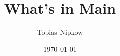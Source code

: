 \documentclass[12pt,a4paper]{article}
\begin{document}
\title{What's in Main}
\author{Tobias Nipkow}
\date{\today}
\maketitle


\end{document}
